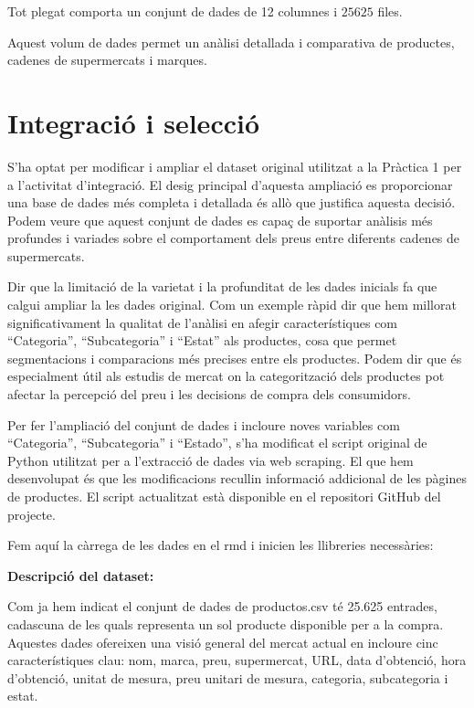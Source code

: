 \documentclass[
]{article}
\begin{document}
Tot plegat comporta un conjunt de dades de 12 columnes i \(25625\)
files.

Aquest volum de dades permet un anàlisi detallada i comparativa de
productes, cadenes de supermercats i marques.

\hypertarget{integraciuxf3-i-selecciuxf3}{%
\section{Integració i selecció}\label{integraciuxf3-i-selecciuxf3}}

S'ha optat per modificar i ampliar el dataset original utilitzat a la
Pràctica 1 per a l'activitat d'integració. El desig principal d'aquesta
ampliació es proporcionar una base de dades més completa i detallada és
allò que justifica aquesta decisió. Podem veure que aquest conjunt de
dades es capaç de suportar anàlisis més profundes i variades sobre el
comportament dels preus entre diferents cadenes de supermercats.

Dir que la limitació de la varietat i la profunditat de les dades
inicials fa que calgui ampliar la les dades original. Com un exemple
ràpid dir que hem millorat significativament la qualitat de l'anàlisi en
afegir característiques com ``Categoria'', ``Subcategoria'' i ``Estat''
als productes, cosa que permet segmentacions i comparacions més precises
entre els productes. Podem dir que és especialment útil als estudis de
mercat on la categorització dels productes pot afectar la percepció del
preu i les decisions de compra dels consumidors.

Per fer l'ampliació del conjunt de dades i incloure noves variables com
``Categoria'', ``Subcategoria'' i ``Estado'', s'ha modificat el script
original de Python utilitzat per a l'extracció de dades via web
scraping. El que hem desenvolupat és que les modificacions recullin
informació addicional de les pàgines de productes. El script actualitzat
està disponible en el repositori GitHub del projecte.

Fem aquí la càrrega de les dades en el rmd i inicien les llibreries
necessàries:

\textbf{Descripció del dataset:}

Com ja hem indicat el conjunt de dades de productos.csv té 25.625
entrades, cadascuna de les quals representa un sol producte disponible
per a la compra. Aquestes dades ofereixen una visió general del mercat
actual en incloure cinc característiques clau: nom, marca, preu,
supermercat, URL, data d'obtenció, hora d'obtenció, unitat de mesura,
preu unitari de mesura, categoria, subcategoria i estat.
\end{document}
